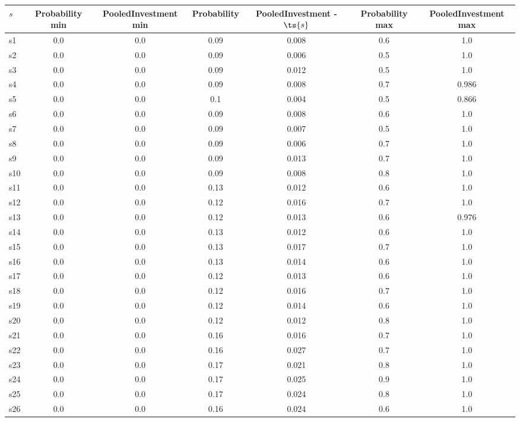 \documentclass{article}
\begin{document}
\noindent\begin{tabular}{|l|c|c|c|c|c|c|}
\hline
$s$& Probability min & PooledInvestment min & Probability & PooledInvestment - $\ts{s}$ & Probability max & PooledInvestment max\\
\hline
s1 &0.0 & 0.0 & 0.09 & 0.008 & 0.6 & 1.0\\
\hline
s2 &0.0 & 0.0 & 0.09 & 0.006 & 0.5 & 1.0\\
\hline
s3 &0.0 & 0.0 & 0.09 & 0.012 & 0.5 & 1.0\\
\hline
s4 &0.0 & 0.0 & 0.09 & 0.008 & 0.7 & 0.986\\
\hline
s5 &0.0 & 0.0 & 0.1 & 0.004 & 0.5 & 0.866\\
\hline
s6 &0.0 & 0.0 & 0.09 & 0.008 & 0.6 & 1.0\\
\hline
s7 &0.0 & 0.0 & 0.09 & 0.007 & 0.5 & 1.0\\
\hline
s8 &0.0 & 0.0 & 0.09 & 0.006 & 0.7 & 1.0\\
\hline
s9 &0.0 & 0.0 & 0.09 & 0.013 & 0.7 & 1.0\\
\hline
s10 &0.0 & 0.0 & 0.09 & 0.008 & 0.8 & 1.0\\
\hline
s11 &0.0 & 0.0 & 0.13 & 0.012 & 0.6 & 1.0\\
\hline
s12 &0.0 & 0.0 & 0.12 & 0.016 & 0.7 & 1.0\\
\hline
s13 &0.0 & 0.0 & 0.12 & 0.013 & 0.6 & 0.976\\
\hline
s14 &0.0 & 0.0 & 0.13 & 0.012 & 0.6 & 1.0\\
\hline
s15 &0.0 & 0.0 & 0.13 & 0.017 & 0.7 & 1.0\\
\hline
s16 &0.0 & 0.0 & 0.13 & 0.014 & 0.6 & 1.0\\
\hline
s17 &0.0 & 0.0 & 0.12 & 0.013 & 0.6 & 1.0\\
\hline
s18 &0.0 & 0.0 & 0.12 & 0.016 & 0.7 & 1.0\\
\hline
s19 &0.0 & 0.0 & 0.12 & 0.014 & 0.6 & 1.0\\
\hline
s20 &0.0 & 0.0 & 0.12 & 0.012 & 0.8 & 1.0\\
\hline
s21 &0.0 & 0.0 & 0.16 & 0.016 & 0.7 & 1.0\\
\hline
s22 &0.0 & 0.0 & 0.16 & 0.027 & 0.7 & 1.0\\
\hline
s23 &0.0 & 0.0 & 0.17 & 0.021 & 0.8 & 1.0\\
\hline
s24 &0.0 & 0.0 & 0.17 & 0.025 & 0.9 & 1.0\\
\hline
s25 &0.0 & 0.0 & 0.17 & 0.024 & 0.8 & 1.0\\
\hline
s26 &0.0 & 0.0 & 0.16 & 0.024 & 0.6 & 1.0\\

\end{tabular}
\end{document}
